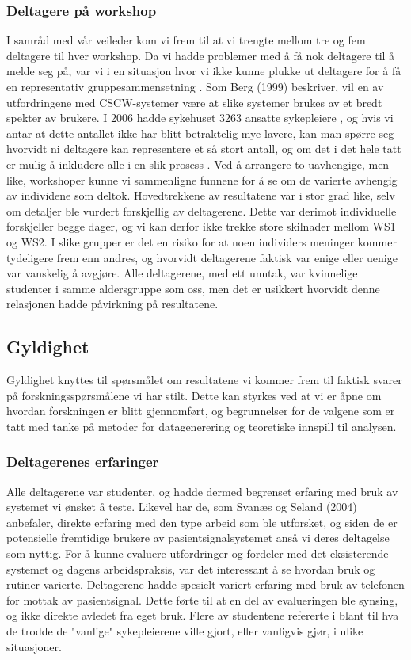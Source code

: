 \subsubsection{Deltagere på workshop}
I samråd med vår veileder kom vi frem til at vi trengte mellom tre og fem deltagere til hver workshop. Da vi hadde problemer med å få nok deltagere til å melde seg på, var vi i en situasjon hvor vi ikke kunne plukke ut deltagere for å få en representativ gruppesammensetning \cite{Seland, Cavaye95}. Som Berg (1999) beskriver, vil en av utfordringene med CSCW-systemer være at slike systemer brukes av et bredt spekter av brukere. I 2006 hadde sykehuset 3263 ansatte sykepleiere \cite{nokkeltall}, og hvis vi antar at dette antallet ikke har blitt betraktelig mye lavere, kan man spørre seg hvorvidt ni deltagere kan representere et så stort antall, og om det i det hele tatt er mulig å inkludere alle i en slik prosess \cite{Cavaye95}. Ved å arrangere to uavhengige, men like, workshoper kunne vi sammenligne funnene for å se om de varierte avhengig av individene som deltok. Hovedtrekkene av resultatene var i stor grad like, selv om detaljer ble vurdert forskjellig av deltagerene. Dette var derimot individuelle forskjeller begge dager, og vi kan derfor ikke trekke store skilnader mellom WS1 og WS2. I slike grupper er det en risiko for at noen individers meninger kommer tydeligere frem enn andres, og hvorvidt deltagerene faktisk var enige eller uenige var vanskelig å avgjøre. Alle deltagerene, med ett unntak, var kvinnelige studenter i samme aldersgruppe som oss, men det er usikkert hvorvidt denne relasjonen hadde påvirkning på resultatene.

\subsection{Gyldighet}
Gyldighet knyttes til spørsmålet om resultatene vi kommer frem til faktisk svarer på forskningsspørsmålene vi har stilt. Dette kan styrkes ved at vi er åpne om hvordan forskningen er blitt gjennomført, og begrunnelser for de valgene som er tatt med tanke på metoder for datagenerering og teoretiske innspill til analysen. 

\subsubsection{Deltagerenes erfaringer}
Alle deltagerene var studenter, og hadde dermed begrenset erfaring med bruk av systemet vi ønsket å teste. Likevel har de, som Svanæs og Seland (2004) anbefaler, direkte erfaring med den type arbeid som ble utforsket, og siden de er potensielle fremtidige brukere av pasientsignalsystemet anså vi deres deltagelse som nyttig. For å kunne evaluere utfordringer og fordeler med det eksisterende systemet og dagens arbeidspraksis, var det interessant å se hvordan bruk og rutiner varierte. Deltagerene hadde spesielt variert erfaring med bruk av telefonen for mottak av pasientsignal. Dette førte til at en del av evalueringen ble synsing, og ikke direkte avledet fra eget bruk. Flere av studentene refererte i blant til hva de trodde de "vanlige" sykepleierene ville gjort, eller vanligvis gjør, i ulike situasjoner. 

